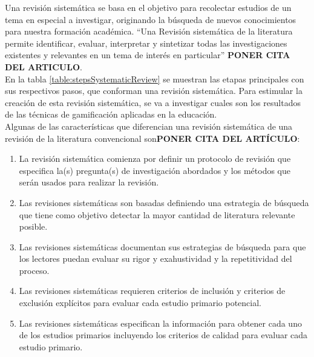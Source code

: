 \documentclass{report}
\begin{document}
    Una revisión sistemática se basa en el objetivo para recolectar estudios de un tema en especial a investigar, originando la búsqueda de nuevos conocimientos para nuestra formación académica. ``Una Revisión sistemática de la literatura permite identificar, evaluar, interpretar y sintetizar todas las investigaciones existentes y relevantes en un tema de interés en particular'' \textbf{PONER CITA DEL ARTICULO}.\\
        En la tabla \ref{table:stepsSystematicReview} se muestran las etapas principales con sus respectivos pasos, que conforman una revisión sistemática. Para estimular la creación de esta revisión sistemática, se va a investigar cuales son los resultados de las técnicas de gamificación aplicadas en la educación.\\
Algunas de las características que diferencian una revisión sistemática de una revisión de la literatura convencional son\textbf{PONER CITA DEL ARTÍCULO}:
    \begin{enumerate}    
    	\item La revisión sistemática comienza por definir un protocolo de revisión que especifica la(s) pregunta(s) de investigación abordados y los métodos que serán usados para realizar la revisión.
    	\item Las revisiones sistemáticas son basadas definiendo una estrategia de búsqueda que tiene como objetivo detectar la mayor cantidad de literatura relevante posible.
	    \item Las revisiones sistemáticas documentan sus estrategias de búsqueda para que los lectores puedan evaluar su rigor y exahustividad y la repetitividad del proceso.
    	\item Las revisiones sistemáticas requieren criterios de inclusión y criterios de exclusión explícitos para evaluar cada estudio primario potencial.
	    \item Las revisiones sistemáticas especifican la información para obtener cada uno de los estudios primarios incluyendo los criterios de calidad para evaluar cada estudio primario.
    \end{enumerate}
\end{document}
